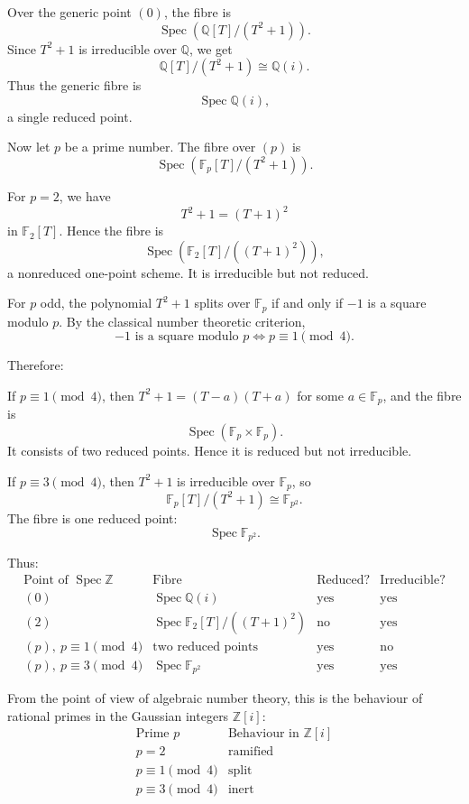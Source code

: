Over the generic point \((0)\), the fibre is
\[
\operatorname{Spec}
\left(
\mathbb{Q}[T]/(T^2+1)
\right).
\]
Since \(T^2+1\) is irreducible over \(\mathbb{Q}\), we get
\[
\mathbb{Q}[T]/(T^2+1)\cong \mathbb{Q}(i).
\]
Thus the generic fibre is
\[
\operatorname{Spec}\mathbb{Q}(i),
\]
a single reduced point.

Now let \(p\) be a prime number. The fibre over \((p)\) is
\[
\operatorname{Spec}
\left(
\mathbb{F}_p[T]/(T^2+1)
\right).
\]

For \(p=2\), we have
\[
T^2+1=(T+1)^2
\]
in \(\mathbb{F}_2[T]\). Hence the fibre is
\[
\operatorname{Spec}\left(\mathbb{F}_2[T]/((T+1)^2)\right),
\]
a nonreduced one-point scheme. It is irreducible but not reduced.

For \(p\) odd, the polynomial \(T^2+1\) splits over \(\mathbb{F}_p\) if
and only if \(-1\) is a square modulo \(p\). By the classical number
theoretic criterion,
\[
-1 \text{ is a square modulo }p
\iff
p\equiv 1 \pmod 4.
\]

Therefore:

If \(p\equiv1\pmod4\), then \(T^2+1=(T-a)(T+a)\)
for some \(a\in \mathbb{F}_p\), and the fibre is
\[
\operatorname{Spec}(\mathbb{F}_p\times \mathbb{F}_p).
\]
It consists of two reduced points. Hence it is reduced but not
irreducible.

If \(p\equiv3\pmod4\), then \(T^2+1\) is irreducible over \(\mathbb F_p\), so
\[
\mathbb{F}_p[T]/(T^2+1)\cong \mathbb{F}_{p^2}.
\]
The fibre is one reduced point:
\[
\operatorname{Spec}\mathbb{F}_{p^2}.
\]

Thus:
\[
\begin{array}{c|c|c|c}
	\text{Point of }\operatorname{Spec}\mathbb{Z}
	&
	\text{Fibre}
	&
	\text{Reduced?}
	&
	\text{Irreducible?}
	\\
	\hline
	(0)
	&
	\operatorname{Spec}\mathbb{Q}(i)
	&
	\text{yes}
	&
	\text{yes}
	\\
	(2)
	&
	\operatorname{Spec}\mathbb{F}_2[T]/((T+1)^2)
	&
	\text{no}
	&
	\text{yes}
	\\
	(p),\ p\equiv 1\pmod 4
	&
	\text{two reduced points}
	&
	\text{yes}
	&
	\text{no}
	\\
	(p),\ p\equiv 3\pmod 4
	&
	\operatorname{Spec}\mathbb{F}_{p^2}
	&
	\text{yes}
	&
	\text{yes}
\end{array}
\]

From the point of view of algebraic number theory, this is the behaviour
of rational primes in the Gaussian integers \(\mathbb{Z}[i]\):
\[
\begin{array}{c|c}
	\text{Prime }p
	&
	\text{Behaviour in }\mathbb{Z}[i]
	\\
	\hline
	p=2
	&
	\text{ramified}
	\\
	p\equiv 1\pmod 4
	&
	\text{split}
	\\
	p\equiv 3\pmod 4
	&
	\text{inert}
\end{array}
\]

